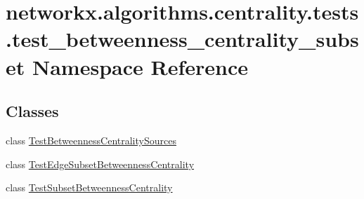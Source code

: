 \hypertarget{namespacenetworkx_1_1algorithms_1_1centrality_1_1tests_1_1test__betweenness__centrality__subset}{}\section{networkx.\+algorithms.\+centrality.\+tests.\+test\+\_\+betweenness\+\_\+centrality\+\_\+subset Namespace Reference}
\label{namespacenetworkx_1_1algorithms_1_1centrality_1_1tests_1_1test__betweenness__centrality__subset}
\subsection*{Classes}
\begin{DoxyCompactItemize}
\item 
class \hyperlink{classnetworkx_1_1algorithms_1_1centrality_1_1tests_1_1test__betweenness__centrality__subset_1_1TestBetweennessCentralitySources}{Test\+Betweenness\+Centrality\+Sources}
\item 
class \hyperlink{classnetworkx_1_1algorithms_1_1centrality_1_1tests_1_1test__betweenness__centrality__subset_1_1Tf34b72e23226bda9408e58bb44a2bc70}{Test\+Edge\+Subset\+Betweenness\+Centrality}
\item 
class \hyperlink{classnetworkx_1_1algorithms_1_1centrality_1_1tests_1_1test__betweenness__centrality__subset_1_1TestSubsetBetweennessCentrality}{Test\+Subset\+Betweenness\+Centrality}
\end{DoxyCompactItemize}
